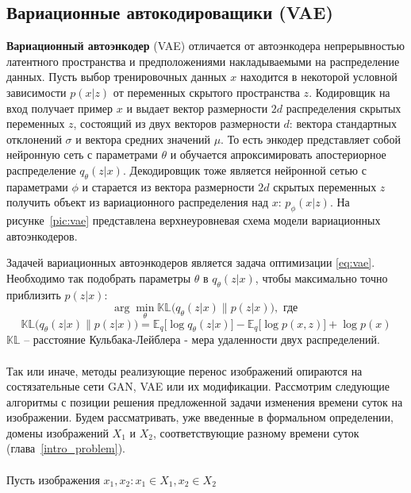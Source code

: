\documentclass[11pt,a4paper]{extarticle}
\begin{document}
	\subsection{Вариационные автокодироващики (VAE)} \label{sec:vae}		

		\textbf{Вариационный автоэнкодер} (VAE) отличается от автоэнкодера непрерывностью латентного пространства
		и предположениями накладываемыми на распределение данных.
		Пусть выбор тренировочных данных $x$ находится в некоторой условной зависимости $p(x|z)$ от переменных скрытого пространства $z$.
		Кодировщик на вход получает пример $x$ и выдает вектор размерности $2d$ распределения скрытых переменных $z$, состоящий из двух векторов размерности $d$:
		вектора стандартных отклонений $\sigma$ и вектора средних значений $\mu$. 
		То есть энкодер представляет собой нейронную сеть с параметрами $\theta$ и обучается апроксимировать апостериорное распределение $q_{\theta}(z|x)$.
		Декодировщик тоже является нейронной сетью с параметрами $\phi$ и старается из вектора размерности $2d$ скрытых переменных $z$ получить объект из вариационного распределения над $x$: $p_{\phi}(x|z)$.
		На рисунке~\ref{pic:vae} представлена верхнеуровневая схема модели вариационных автоэнкодеров.

		Задачей вариационных автоэнкодеров является задача оптимизации \eqref{eq:vae}.
		Необходимо так подобрать параметры $\theta$ в $q_{\theta}(z|x)$, чтобы максимально точно приблизить $p(z|x)$:
		\begin{equation} \label{eq:vae}
			\arg\min_{\theta} \mathbb{KL}\big(q_{\theta}(z|x)\|p(z|x)\big), \text { где }
		\end{equation}
		\begin{equation*}
			\mathbb{KL}\big(q_{\theta}(z|x)\|p(z|x)\big) = \mathbb{E}_q\big[\log q_{\theta}(z|x)\big] - \mathbb{E}_q\big[\log p(x,z)\big] + \log p(x)
		\end{equation*}
		$\mathbb{KL}$ -- расстояние Кульбака-Лейблера - мера удаленности двух распределений.
		\\\\
		Так или иначе, методы реализующие перенос изображений опираются на состязательные сети GAN, VAE или их модификации.
		Рассмотрим следующие алгоритмы с позиции решения предложенной задачи изменения времени суток на изображении.
		Будем рассматривать, уже введенные в формальном определении, домены изображений \(X_{1}\) и \(X_{2}\), соответствующие разному времени суток (глава~\ref{intro_problem}).
		\\\\Пусть изображения \(x_{1},x_{2}: x_{1} \in X_{1}, x_{2} \in X_{2}\)
\end{document}

